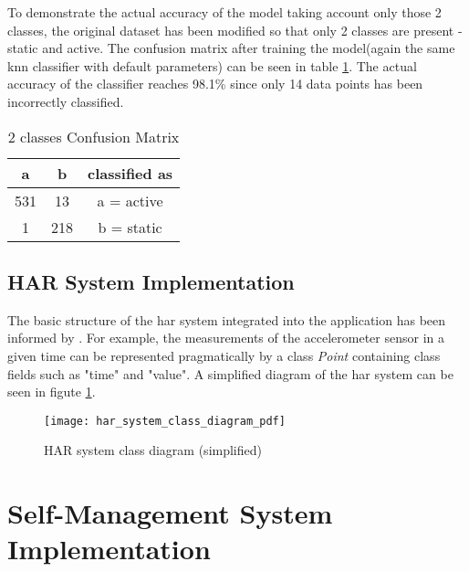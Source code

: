 To demonstrate the actual accuracy of the model taking account only those 2 classes, the original dataset has been modified so that only 2 classes are present - static and active. The confusion matrix after training the model(again the same \gls{knn} classifier with default parameters) can be seen in table \ref{table:2_class_confusion_matrix}. The actual accuracy of the classifier reaches 98.1\% since only 14 data points has been incorrectly classified.

\begin{table}[ht]
\centering
\begin{tabular}{ |c|c|c| } 
 \hline
 a & b & classified as\\
 \hline \hline
  531 & 13 & a = active\\
  1 & 218 & b = static\\
 \hline
\end{tabular}
\caption{2 classes Confusion Matrix}
\label{table:2_class_confusion_matrix}
\end{table}
    
    \subsection{HAR System Implementation}
    The basic structure of the \gls{har} system integrated into the application has been informed by \citet[149]{labrador2013}. For example, the measurements of the accelerometer sensor in a given time can be represented pragmatically by a class \textit{Point} containing class fields such as "time" and "value". A simplified diagram of the \gls{har} system can be seen in figute \ref{fig:har_system_impl_class_diagram}.
    
    \begin{figure}[ht]
        \centering
        \texttt{[image: har\_system\_class\_diagram\_pdf]}
        \caption{HAR system class diagram (simplified)}
        \label{fig:har_system_impl_class_diagram}
    \end{figure}
    

\section{Self-Management System Implementation}



    
    
    
    
